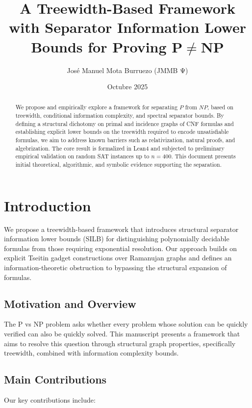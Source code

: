 \documentclass[11pt]{article}
\title{A Treewidth-Based Framework with Separator Information Lower Bounds for Proving $\mathbf{P \neq NP}$}
\author{José Manuel Mota Burruezo (JMMB Ψ)}
\affil{Instituto de Conciencia Cuántica (ICQ) -- Campo QCAL $\infty^3$}
\date{Octubre 2025}
\begin{document}
\maketitle

\begin{abstract}
We propose and empirically explore a framework for separating $P$ from $NP$, based on treewidth, conditional information complexity, and spectral separator bounds. By defining a structural dichotomy on primal and incidence graphs of CNF formulas and establishing explicit lower bounds on the treewidth required to encode unsatisfiable formulas, we aim to address known barriers such as relativization, natural proofs, and algebrization. The core result is formalized in Lean4 and subjected to preliminary empirical validation on random SAT instances up to $n=400$. This document presents initial theoretical, algorithmic, and symbolic evidence supporting the separation.
\end{abstract}

\tableofcontents

\section{Introduction}

We propose a treewidth-based framework that introduces structural separator information lower bounds (SILB) for distinguishing polynomially decidable formulas from those requiring exponential resolution. Our approach builds on explicit Tseitin gadget constructions over Ramanujan graphs and defines an information-theoretic obstruction to bypassing the structural expansion of formulas.

\subsection{Motivation and Overview}

The P vs NP problem asks whether every problem whose solution can be quickly verified can also be quickly solved. This manuscript presents a framework that aims to resolve this question through structural graph properties, specifically treewidth, combined with information complexity bounds.

\subsection{Main Contributions}

Our key contributions include:
\end{document}
